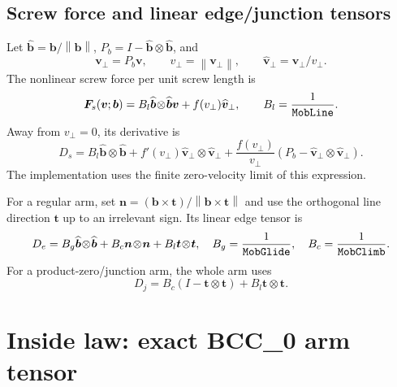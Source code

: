 \documentclass[11pt]{article}
\newcommand{\vect}[1]{\bm{#1}}
\newcommand{\norm}[1]{\left\lVert #1\right\rVert}
\newcommand{\dyad}[2]{#1\!\otimes\!#2}
\newcommand{\code}[1]{\texttt{\detokenize{#1}}}
\begin{document}
\subsection{Screw force and linear edge/junction tensors}

Let \(\widehat{\vect{b}}=\vect{b}/\norm{\vect{b}}\),
\(P_b=I-\dyad{\widehat{\vect{b}}}{\widehat{\vect{b}}}\), and
\begin{equation}
 \vect{v}_{\perp}=P_b\vect{v},\qquad
 v_{\perp}=\norm{\vect{v}_{\perp}},\qquad
 \widehat{\vect{v}}_{\perp}=\vect{v}_{\perp}/v_{\perp}.
\end{equation}
The nonlinear screw force per unit screw length is
\begin{equation}
 \vect{F}_s(\vect{v};\vect{b})
 =B_l\dyad{\widehat{\vect{b}}}{\widehat{\vect{b}}}\vect{v}
  +f(v_{\perp})\widehat{\vect{v}}_{\perp},
 \qquad B_l=\frac{1}{\code{MobLine}}.
 \label{eq:screw-force}
\end{equation}
Away from \(v_{\perp}=0\), its derivative is
\begin{equation}
 D_s=B_l\dyad{\widehat{\vect{b}}}{\widehat{\vect{b}}}
 +f'(v_{\perp})
   \dyad{\widehat{\vect{v}}_{\perp}}{\widehat{\vect{v}}_{\perp}}
 +\frac{f(v_{\perp})}{v_{\perp}}
  \left(P_b-
   \dyad{\widehat{\vect{v}}_{\perp}}{\widehat{\vect{v}}_{\perp}}
  \right).
 \label{eq:screw-jacobian}
\end{equation}
The implementation uses the finite zero-velocity limit of this expression.

For a regular arm, set
\(\vect{n}=(\vect{b}\times\vect{t})/
\norm{\vect{b}\times\vect{t}}\) and use the orthogonal line direction
\(\vect{t}\) up to an irrelevant sign.  Its linear edge tensor is
\begin{equation}
 D_e=B_g\dyad{\widehat{\vect{b}}}{\widehat{\vect{b}}}
     +B_c\dyad{\vect{n}}{\vect{n}}
     +B_l\dyad{\vect{t}}{\vect{t}},
 \quad
 B_g=\frac1{\code{MobGlide}},\quad
 B_c=\frac1{\code{MobClimb}}.
 \label{eq:edge-tensor}
\end{equation}
For a product-zero/junction arm, the whole arm uses
\begin{equation}
 D_j=B_c(I-\dyad{\vect{t}}{\vect{t}})
     +B_l\dyad{\vect{t}}{\vect{t}}.
 \label{eq:junction-tensor}
\end{equation}

\section{Inside law: exact BCC\_0 arm tensor}
\end{document}
